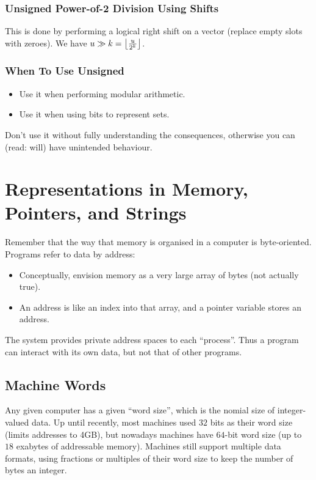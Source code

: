 \documentclass[class=article, crop=false]{standalone}
\begin{document}
  \subsubsection{Unsigned Power-of-2 Division Using Shifts}
  This is done by performing a logical right shift on a vector (replace empty slots with zeroes). We have $u\gg k = \left\lfloor \frac{u}{2^k} \right\rfloor$.
  \subsubsection{When To Use Unsigned}
  \begin{itemize}
    \item Use it when performing modular arithmetic.
    \item Use it when using bits to represent sets.
  \end{itemize}
  \begin{note}{}
    Don't use it without fully understanding the consequences, otherwise you can (read: will) have unintended behaviour.
  \end{note}
  \section{Representations in Memory, Pointers, and Strings}
  Remember that the way that memory is organised in a computer is byte-oriented. \\[10pt]
  Programs refer to data by address:
  \begin{itemize}
    \item Conceptually, envision memory as a very large array of bytes (not actually true).
    \item An address is like an index into that array, and a pointer variable stores an address.
  \end{itemize}
  \begin{note}{}
    The system provides private address spaces to each ``process''. Thus a program can interact with its own data, but not that of other programs.
  \end{note}
  \subsection{Machine Words}
  Any given computer has a given ``word size'', which is the nomial size of integer-valued data. Up until recently, most machines used $32$ bits as their word size (limits addresses to 4GB), but nowadays machines have $64$-bit word size (up to $18$ exabytes of addressable memory). Machines still support multiple data formats, using fractions or multiples of their word size to keep the number of bytes an integer.
\end{document}
